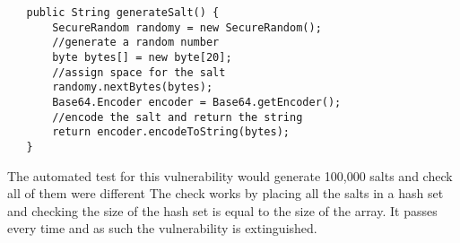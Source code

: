 \begin{verbatim}
   public String generateSalt() {
       SecureRandom randomy = new SecureRandom();
       //generate a random number
       byte bytes[] = new byte[20];
       //assign space for the salt
       randomy.nextBytes(bytes);
       Base64.Encoder encoder = Base64.getEncoder();
       //encode the salt and return the string
       return encoder.encodeToString(bytes);
   }
\end{verbatim}
The automated test for this vulnerability would generate 100,000 salts and check all of them were different The check works by placing all the salts in a hash set and checking the
size of the hash set is equal to the size of the array. It passes every time and as such the vulnerability is extinguished.

